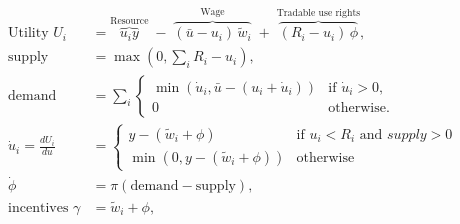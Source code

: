 \documentclass[10pt]{article}
\begin{document}
\begin{align*}
\text{Utility  }  U_i &= \overbrace{u_i y}^{\text{Resource}} \;-\; \overbrace{(\bar{u}-u_i)\,\tilde{w}_i}^{\text{Wage}} \;+\; \overbrace{(R_i - u_i)\,\phi}^{\text{Tradable use rights}}, \\[4pt] 
 \text{supply}  &= \max (0, \sum_{i} R_i - u_i ), \\[4pt]
 \text{demand}  &= \sum_{i} \begin{cases} \min \left( \dot{u}_i, \bar{u}-(u_i+\dot{u}_i) \right) & \text{if } \dot{u}_i > 0 , \\[4pt] 0 & \text{otherwise}. \end{cases} \\[4pt]
\dot{u}_i = \frac{dU_i}{du} &= \begin{cases} y - (\tilde{w}_i + \phi) & \text{if } u_i < R_i \text{ and } supply>0 \\[4pt] \min \left(0,y - (\tilde{w}_i + \phi) \right)  & \text{otherwise}\end{cases} \\[4pt]
\dot{\phi} &= \pi  \left( \text{demand} - \text{supply} \right),\\[4pt]
\text{incentives   }  \gamma &= \tilde{w}_i + \phi, 
 \end{align*}
\end{document}
